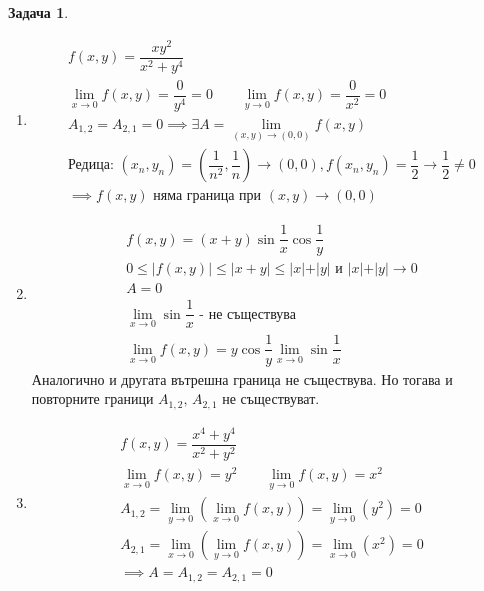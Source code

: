 \documentclass[a4paper,fleqn,12pt]{article}
\theoremstyle{definition}
\newtheorem{task}{Задача}[subsection]
\begin{document}
\begin{task}
\begin{enumerate}
\item 
\begin{gather*}
f(x,y) = \dfrac{xy^2}{x^2+y^4}\\
\lim\limits_{x \to 0} f(x,y) = \dfrac{0}{y^4} = 0 \qquad 
\lim\limits_{y \to 0} f(x,y) = \dfrac{0}{x^2} = 0 \\
A_{1,2} = A_{2,1} = 0 \implies \exists A = \lim\limits_{(x,y) \to (0,0)} f(x,y) \\
\text{Редица: }(x_n, y_n) = (\dfrac{1}{n^2},\dfrac{1}{n}) \to (0,0), f(x_n, y_n) = \dfrac{1}{2} \to \dfrac{1}{2} \neq 0\\
\implies f(x,y) \text{ няма граница при } (x,y) \to (0,0)
\end{gather*}

\item 
\begin{gather*}
f(x,y) = (x+y) \sin{\dfrac{1}{x}} \cos{\dfrac{1}{y}}\\
0 \leq \vert f(x,y) \vert \leq \vert x + y \vert \leq  \vert x \vert + \vert y \vert \text{ и } \vert x \vert + \vert y \vert \to 0 \\
A = 0 \\
\lim\limits_{x \to 0} \sin{\dfrac{1}{x}} \text{ - не съществува} \\
\lim\limits_{x \to 0} f(x,y) = y\cos{\dfrac{1}{y}} \lim\limits_{x \to 0} \sin{\dfrac{1}{x}}
\end{gather*}
Аналогично и другата вътрешна граница не съществува. Но тогава и повторните граници $A_{1,2},\, A_{2,1}$ не съществуват.


\item
\begin{gather*}
f(x,y) = \dfrac{x^4 + y^4}{x^2 + y^2}\\
\lim\limits_{x \to 0} f(x,y) = y^2 \qquad 
\lim\limits_{y \to 0} f(x,y) = x^2 \\
A_{1,2} = \lim\limits_{y \to 0} \left( \lim\limits_{x \to 0} f(x,y) \right) = \lim\limits_{y \to 0} \left( y^2 \right) = 0\\
A_{2,1} = \lim\limits_{x \to 0} \left( \lim\limits_{y \to 0} f(x,y) \right) = \lim\limits_{x \to 0} \left( x^2 \right) = 0 \\
\implies A = A_{1,2} = A_{2,1} = 0
\end{gather*}

\end{enumerate}

\end{task}
\end{document}
